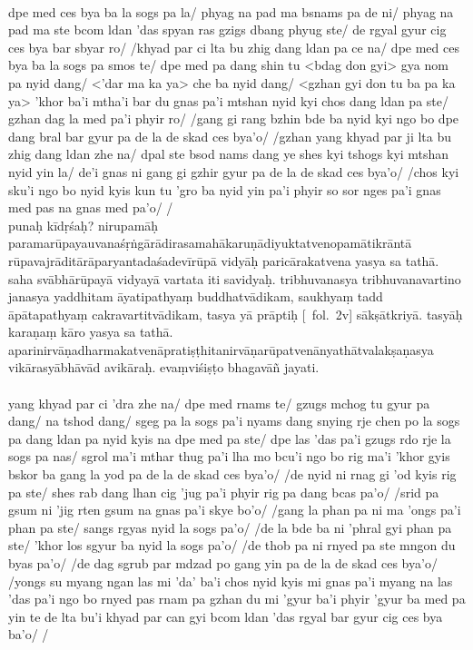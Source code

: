 \documentclass[12pt]{article}
\begin{document}
\textbf{\TVB}\\
dpe med ces bya ba la sogs pa la/ phyag na pad ma bsnams pa de ni/ phyag na pad ma ste bcom ldan 'das spyan ras gzigs dbang phyug ste/ de rgyal gyur cig ces bya bar sbyar ro/ /khyad par ci lta bu zhig dang ldan pa ce na/ dpe med ces bya ba la sogs pa smos te/ dpe med pa dang shin tu <bdag don gyi> gya nom pa nyid dang/ <'dar ma ka ya> che ba nyid dang/ <gzhan gyi don tu ba pa ka ya> 'khor ba'i mtha'i bar du gnas pa'i mtshan nyid kyi chos dang ldan pa ste/ gzhan dag la med pa'i phyir ro/ /gang gi rang bzhin bde ba nyid kyi ngo bo dpe dang bral bar gyur pa de la de skad ces bya'o/ /gzhan yang khyad par ji lta bu zhig dang ldan zhe na/ dpal ste bsod nams dang ye shes kyi tshogs kyi mtshan nyid yin la/ de'i gnas ni gang gi gzhir gyur pa de la de skad ces bya'o/ /chos kyi sku'i ngo bo nyid kyis kun tu 'gro ba nyid yin pa'i phyir so sor nges pa'i gnas med pas na gnas med pa'o/ /\\

punaḥ kīdṛśaḥ?
nirupamāḥ paramarūpayauvanaśṛṅgārādirasamahākaruṇādiyuktatvenopamātikrāntā rūpavajrāditārāparyantadaśadevīrūpā vidyāḥ paricārakatvena\footnoteB{
	paricārakatvena] \conj ; saparicārakatvena \MS\ \EDD
} yasya sa tathā.
saha svābhārūpayā vidyayā vartata iti savidyaḥ.
tribhuvanasya tribhuvanavartino janasya yaddhitam āyatipathyaṃ\footnoteB{
	āyatipathyaṃ] \emph{variant word division in} \EDD , āyati pathyaṃ; \emph{and in} \MS\, āyati pathyaṃ
} buddhatvādikam, saukhyaṃ tadd āpātapathyaṃ\footnoteB{
	āpātapathyaṃ] \conj\ (\TVA: 'phral gyi phan pa); āpayati pathyaṃ \MS\ \EDD ; de la bde ba ni bde ba ste \TVB
} cakravartitvādikam, tasya yā prāptiḥ [\MS\ fol.\ 2v] sākṣātkriyā.
tasyāḥ karaṇaṃ kāro yasya sa tathā.
aparinirvāṇadharmakatvenāpratiṣṭhitanirvāṇarūpatvenānyathātvalakṣaṇasya vikārasyābhāvād avikāraḥ.
evaṃviśiṣṭo bhagavāñ jayati.\\

\textbf{\TVA}\\
yang khyad par ci 'dra zhe na/ dpe med rnams te/ gzugs mchog tu gyur pa dang/ na tshod dang/ sgeg pa la sogs pa'i nyams dang snying rje chen po la sogs pa dang ldan pa nyid kyis na dpe med pa ste/ dpe las 'das pa'i gzugs rdo rje la sogs pa nas/ sgrol ma'i mthar thug pa'i lha mo bcu'i ngo bo rig ma'i 'khor gyis bskor ba gang la yod pa de la de skad ces bya'o/ /de nyid ni rnag gi 'od kyis rig pa ste/ shes rab dang lhan cig 'jug pa'i phyir rig pa dang bcas pa'o/ /srid pa gsum ni 'jig rten gsum na gnas pa'i skye bo'o/ /gang la phan pa ni ma 'ongs pa'i phan pa ste/ sangs rgyas nyid la sogs pa'o/ /de la bde ba ni 'phral gyi phan pa ste/ 'khor los sgyur ba nyid la sogs pa'o/ /de thob pa ni rnyed pa ste mngon du byas pa'o/ /de dag sgrub par mdzad po gang yin pa de la de skad ces bya'o/ /yongs su myang ngan las mi 'da' ba'i chos nyid kyis mi gnas pa'i myang na las 'das pa'i ngo bo rnyed pas rnam pa gzhan du mi 'gyur ba'i phyir 'gyur ba med pa yin te de lta bu'i khyad par can gyi bcom ldan 'das rgyal bar gyur cig ces bya ba'o/ /\\
\end{document}
